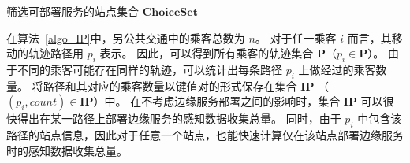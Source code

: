 \begin{algorithm}[!b]
\setstretch{\algostretch}
\caption{筛选可部署服务的站点集合 $\boldsymbol{ChoiceSet}$}
\label{algo_IP}
\end{algorithm}

在算法~\ref{algo_IP}中，另公共交通中的乘客总数为 $n$。
对于任一乘客 $i$ 而言，其移动的轨迹路径用 $p_i$ 表示。
因此，可以得到所有乘客的轨迹集合 $\boldsymbol{P}$（$p_i \in \boldsymbol{P}$）。
由于不同的乘客可能存在同样的轨迹，可以统计出每条路径 $p_i$ 上做经过的乘客数量。
将路径和其对应的乘客数量以键值对的形式保存在集合 $\boldsymbol{IP}$ （$(p_i, count) \in \boldsymbol{IP}$）中。
在不考虑边缘服务部署之间的影响时，集合 $\boldsymbol{IP}$ 可以很快得出在某一路径上部署边缘服务的感知数据收集总量。
同时，由于 $p_i$ 中包含该路径的站点信息，因此对于任意一个站点，也能快速计算仅在该站点部署边缘服务时的感知数据收集总量。

